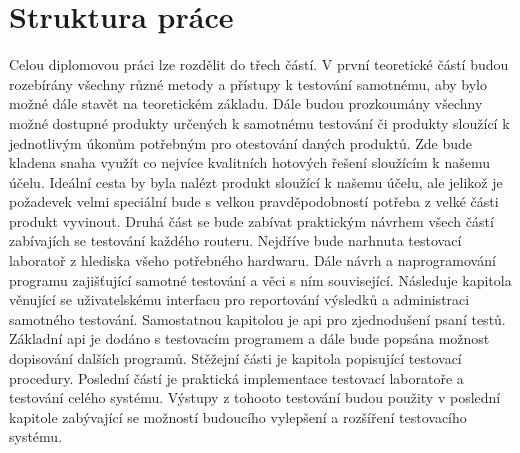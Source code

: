 \section{Struktura práce}
Celou diplomovou práci lze rozdělit do třech částí. V první teoretické částí budou rozebírány všechny různé metody a přístupy k testování samotnému, aby bylo možné dále stavět na teoretickém základu. Dále budou prozkoumány všechny možné dostupné produkty určených k samotnému testování či produkty sloužící k jednotlivým úkonům potřebným pro otestování daných produktů. Zde bude kladena snaha využít co nejvíce kvalitních hotových řešení sloužícím k našemu účelu. Ideální cesta by byla nalézt produkt sloužící k našemu účelu, ale jelikož je požadevek velmi speciální bude s velkou pravděpodobností potřeba z velké části produkt vyvinout. Druhá část se bude zabívat praktickým návrhem všech částí zabívajích se testování každého routeru. Nejdříve bude narhnuta testovací laboratoř z hlediska všeho potřebného hardwaru. Dále návrh a naprogramování programu zajišťující samotné testování a věci s ním související. Následuje kapitola věnující se uživatelskému interfacu pro reportování výsledků a administraci samotného testování. Samostatnou kapitolou je api pro zjednodušení psaní testů. Základní api je dodáno s testovacím programem a dále bude popsána možnost dopisování dalších programů. Stěžejní části je kapitola popisující testovací procedury. Poslední částí je praktická implementace testovací laboratoře a testování celého systému. Výstupy z tohooto testování budou použity v poslední kapitole zabývající se možností budoucího vylepšení a rozšíření testovacího systému.

\endinput
